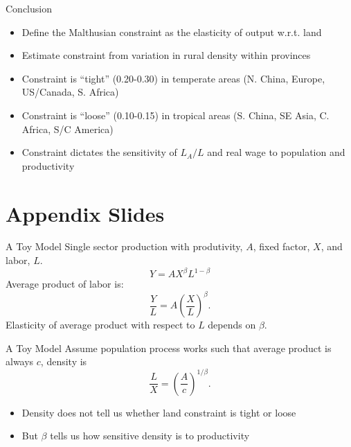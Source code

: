 \documentclass[10pt, xcolor=dvipsnames]{beamer}
\begin{document}
\begin{frame}{Conclusion}
\begin{itemize}
  \item Define the Malthusian constraint as the elasticity of output w.r.t. land
  \item Estimate constraint from variation in rural density within provinces
  \item Constraint is ``tight'' (0.20-0.30) in temperate areas (N. China, Europe, US/Canada, S. Africa)
  \item Constraint is ``loose'' (0.10-0.15) in tropical areas (S. China, SE Asia, C. Africa, S/C America)
  \item Constraint dictates the sensitivity of $L_A/L$ and real wage to population and productivity
\end{itemize}
\end{frame}

\section{Appendix Slides}
\appendix

\begin{frame}{A Toy Model}\label{toy}
Single sector production with produtivity, $A$, fixed factor, $X$, and labor, $L$. 
\begin{equation}
Y = A X^\beta L^{1-\beta}
\end{equation}
Average product of labor is:
\begin{equation}
    \frac{Y}{L} = A \left(\frac{X}{L}\right)^{\beta}.
\end{equation}
Elasticity of average product with respect to $L$ depends on $\beta$.
\end{frame}

\begin{frame}{A Toy Model}
Assume population process works such that average product is always $c$, density is
\begin{equation}
    \frac{L}{X} = \left(\frac{A}{c}\right)^{1/\beta}.
\end{equation}

\begin{itemize}
  \item Density does not tell us whether land constraint is tight or loose 
  \item But $\beta$ tells us how sensitive density is to productivity
\end{itemize}
\hfill \hyperlink{define}{}
\end{frame}
\end{document}
